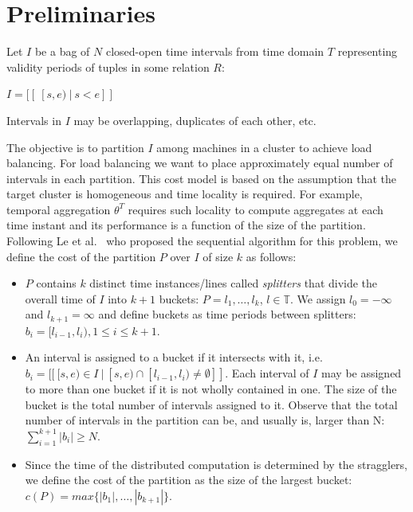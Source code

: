 \section{Preliminaries}
\label{sec:prelim}

Let $I$ be a bag of $N$ closed-open time intervals from time domain
$T$ representing validity periods of tuples in some relation $R$:

$I = [\![ ~[s,e) ~|~ s < e ]\!]$

Intervals in $I$ may be overlapping, duplicates of each other, etc.

The objective is to partition $I$ among machines in a cluster to
achieve load balancing.  For load balancing we want to place
approximately equal number of intervals in each partition.  This cost
model is based on the assumption that the target cluster is
homogeneous and time locality is required.  For example, temporal
aggregation $\theta^T$ requires such locality to compute aggregates at
each time instant and its performance is a function of the size of the
partition.  Following Le et al.~\cite{Le2013} who proposed the
sequential algorithm for this problem, we define the cost of the
partition $P$ over $I$ of size $k$ as follows:

\begin{itemize}
\item $P$ contains $k$ distinct time instances/lines called {\em
  splitters} that divide the overall time of $I$ into $k+1$ buckets:
  $P = l_1,\ldots,l_k$, $l \in \mathbb{T}$.  We assign $l_0 = -\infty$
  and $l_{k+1} = \infty$ and define buckets as time periods between
  splitters: $b_i = [l_{i-1}, l_i), 1 \leq i \leq k+1$.

\item An interval is assigned to a bucket if it intersects with it,
  i.e. $b_i = [\![ ~[s,e) \in I ~|~ [s,e) \cap [l_{i-1},l_i) \neq
            \emptyset ]\!]$.  Each interval of $I$ may be assigned to
        more than one bucket if it is not wholly contained in one.
        The size of the bucket is the total number of intervals
        assigned to it.  Observe that the total number of intervals in
        the partition can be, and usually is, larger than N:
        $\sum_{i=1}^{k+1} |b_i| \geq N$.

\item Since the time of the distributed computation is determined by
  the stragglers, we define the cost of the partition as the size of
  the largest bucket: $c(P) = max\{|b_1|,\ldots,|b_{k+1}|\}$.

\end{itemize}


